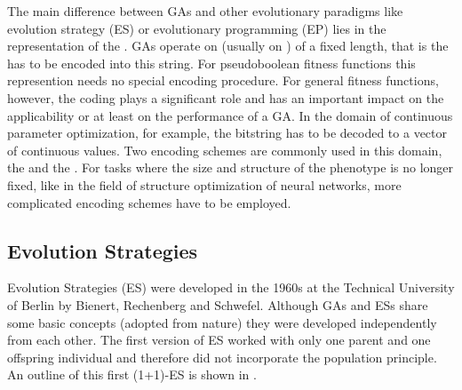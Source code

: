 The main difference between GAs and other evolutionary paradigms like
evolution strategy (ES) or evolutionary programming (EP) lies in the
representation of the \emph{}. GAs operate on
 (usually on ) of a fixed
length, that is the \emph{} has to be encoded into
this string.  For pseudoboolean fitness functions this represention
needs no special encoding procedure. For general fitness functions,
however, the coding plays a significant role and has an important
impact on the applicability or at least on the performance of a GA.
In the domain of continuous parameter optimization, for example, the bitstring has to be
decoded to a vector of continuous values.  Two encoding schemes are
commonly used in this domain, the  and the
.  For tasks where the size and structure of the
phenotype is no longer fixed, like in the field of structure
optimization of neural networks, more complicated encoding schemes
have to be employed.


	\subsection{Evolution Strategies}
	\label{evoalg:subs:evolutionStrategies}

Evolution Strategies (ES) were developed in the 1960s at the
Technical University of Berlin by Bienert, Rechenberg and Schwefel.
Although GAs and ESs share some basic concepts (adopted from nature)
they were developed independently from each other.  The first version
of ES worked with only one parent and one offspring individual and
therefore did not incorporate the population principle.  An outline of
this first (1+1)-ES is shown in .

